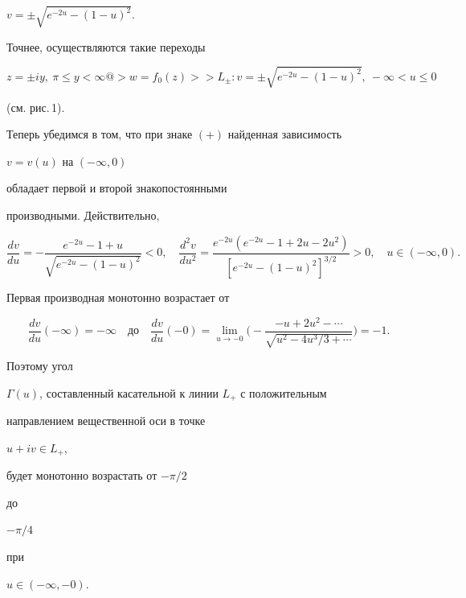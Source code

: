 \begin{pf}
$v=\pm\sqrt{e^{-2u}-(1-u)^{2}}$. 


Точнее, осуществляются такие переходы


$$ 


z=\pm iy,\ \pi\le y<\infty 


@>{w=f_0(z)}>> L_\pm :v= \pm


\sqrt{e^{-2u}-(1-u)^2},\ -\infty<u\le 0 


$$ 


(см. рис.\,1). 


 


Теперь убедимся в том, что при знаке $(+)$ найденная зависимость 


$v=v(u)$ на $(-\infty,0)$ 


обладает первой и второй знакопостоянными 


производными. Действительно, 


$$ 


\frac{dv}{du}=- 


\frac{e^{-2u}-1+u}{\sqrt{e^{-2u}-(1-u)^2}}<0,\quad 


\frac{d^2v}{du^2}= 


\frac{e^{-2u}(e^{-2u}-1+2u-2u^2)}{[e^{-2u}-(1-u)^2]^{3/2}}>0, 


\quad u\in(-\infty,0). 


$$ 


Первая производная монотонно возрастает от 


$$ 


\frac{d v}{d u}(-\infty)=-\infty\quad


\text{до}\quad


\frac{dv}{du}(-0)=\lim_{u\to-0} 


\bigg(-\frac{-u+2u^2-\dotsb}{\sqrt{u^2-4u^3/3+\dotsb}}\bigg)=-1. 


$$ 


Поэтому угол 


$\Gamma(u)$, составленный касательной к линии $L_{+}$ с положительным 


направлением вещественной оси в точке 


$u+iv \in L_{+}$,


будет монотонно возрастать от $-\pi/2$ 


до 


$-\pi/4$ 


при 


$u\in (-\infty, -0)$. 


 



\end{pf}

